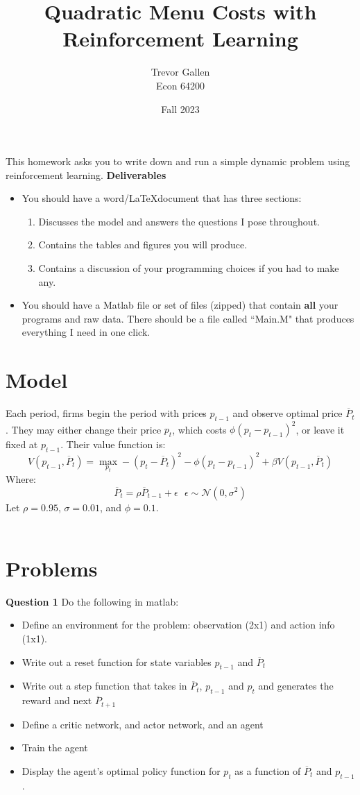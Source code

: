 \documentclass[11pt]{article}
\title{Quadratic Menu Costs with Reinforcement Learning  }
\author{ Trevor Gallen \\ Econ 64200 }
\date{Fall 2023}
\begin{document}


\maketitle

This homework asks you to write down and run a simple dynamic problem using reinforcement learning.
\textbf{Deliverables}
\begin{itemize}
\item You should have a word/\LaTeX document that has three sections: 
\begin{enumerate}
\item Discusses the model and answers the questions I pose throughout.
\item Contains the tables and figures you will produce.
\item Contains a discussion of your programming choices if you had to make any.
\end{enumerate}
\item You should have a Matlab file or set of files (zipped) that contain \textbf{all} your programs and raw data.  There should be a file called ``Main.M" that produces everything I need in one click.
\end{itemize}


\section{Model}
Each period, firms begin the period with prices $p_{t-1}$ and observe optimal price $\overline{P}_t$.  They may either change their price $p_t$, which costs $\phi(p_{t}-p_{t-1})^2$, or leave it fixed at $p_{t-1}$.  Their value function is:
$$V(p_{t-1},\overline{P}_t)=\underset{p_t}{\max} -(p_t-\overline{P}_t)^2-\phi(p_{t}-p_{t-1})^2+\beta V(p_{t-1},\overline{P}_t)$$
Where:
$$\overline{P}_t=\rho \overline{P}_{t-1}+\epsilon\ \ \ \epsilon\sim\mathcal{N}\left(0,\sigma^2\right)$$
Let $\rho=0.95$, $\sigma=0.01$, and $\phi=0.1$.  
\ \\
\ \\

\section{Problems}
\textbf{Question 1} Do the following in matlab:
\begin{itemize}
\item Define an environment for the problem: observation (2x1) and action info (1x1).
\item Write out a reset function for state variables $p_{t-1}$ and $\overline{P}_t$
\item Write out a step function that takes in $\overline{P}_t$, $p_{t-1}$ and $p_{t}$ and generates the reward and next  $\overline{P}_{t+1}$
\item Define a critic network, and actor network, and an agent
\item Train the agent
\item Display the agent's optimal policy function for $p_t$ as a function of $\overline{P}_t$ and $p_{t-1}$.
\end{itemize}
 
\end{document}
